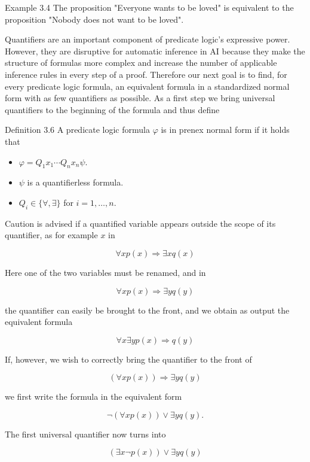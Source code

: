 \documentclass[10pt]{article}
\begin{document}
Example 3.4 The proposition "Everyone wants to be loved" is equivalent to the proposition "Nobody does not want to be loved".

Quantifiers are an important component of predicate logic's expressive power. However, they are disruptive for automatic inference in AI because they make the structure of formulas more complex and increase the number of applicable inference rules in every step of a proof. Therefore our next goal is to find, for every predicate logic formula, an equivalent formula in a standardized normal form with as few quantifiers as possible. As a first step we bring universal quantifiers to the beginning of the formula and thus define

Definition 3.6 A predicate logic formula $\varphi$ is in prenex normal form if it holds that

\begin{itemize}
  \item $\varphi=Q_{1} x_{1} \cdots Q_{n} x_{n} \psi$.
  \item $\psi$ is a quantifierless formula.
  \item $Q_{i} \in\{\forall, \exists\}$ for $i=1, \ldots, n$.
\end{itemize}

Caution is advised if a quantified variable appears outside the scope of its quantifier, as for example $x$ in

$$
\forall x p(x) \Rightarrow \exists x q(x)
$$

Here one of the two variables must be renamed, and in

$$
\forall x p(x) \Rightarrow \exists y q(y)
$$

the quantifier can easily be brought to the front, and we obtain as output the equivalent formula

$$
\forall x \exists y p(x) \Rightarrow q(y)
$$

If, however, we wish to correctly bring the quantifier to the front of


\begin{equation*}
(\forall x p(x)) \Rightarrow \exists y q(y) \tag{3.4}
\end{equation*}


we first write the formula in the equivalent form

$$
\neg(\forall x p(x)) \vee \exists y q(y) .
$$

The first universal quantifier now turns into

$$
(\exists x \neg p(x)) \vee \exists y q(y)
$$
\end{document}
